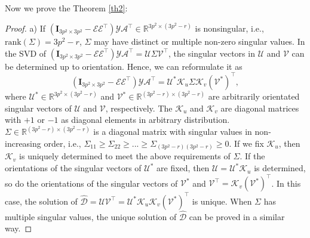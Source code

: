 Now we prove the Theorem \ref{th2}:
\begin{proof} 
a) If $(\bm{I}_{3p^2\times 3p^2}-\mathcal{E}\mathcal{E}^{\top})\mathcal{Y}\mathcal{A}^{\top}\in\mathbb{R}^{3p^2\times (3p^2-r)}$ is nonsingular, i.e., $\text{rank}(\Sigma)=3p^2-r$, $\Sigma$ may have distinct or multiple non-zero singular values. In the SVD \cite{eckart1936approximation} of $(\bm{I}_{3p^2\times 3p^2}-\mathcal{E}\mathcal{E}^{\top})\mathcal{Y}\mathcal{A}^{\top}
=
\mathcal{U}\Sigma\mathcal{V}^{\top}$, the singular vectors in $\mathcal{U}$ and $\mathcal{V}$
can be determined up to orientation. Hence, we can reformulate it as 
\begin{equation}\label{equ27}
(\bm{I}_{3p^2\times 3p^2}-\mathcal{E}\mathcal{E}^{\top})\mathcal{Y}\mathcal{A}^{\top}
=
\mathcal{U}^{*}\mathcal{K}_{u}\Sigma\mathcal{K}_{v}(\mathcal{V}^{*})^{\top},
\end{equation}
where $\mathcal{U}^{*}\in \mathbb{R}^{3p^2\times (3p^2-r)}$ and $\mathcal{V}^{*}\in \mathbb{R}^{(3p^2-r)\times (3p^2-r)}$ are arbitrarily orientated singular vectors of $\mathcal{U}$ and $\mathcal{V}$, respectively. The $\mathcal{K}_{u}$ and $\mathcal{K}_{v}$ are diagonal matrices with $+1$ or $-1$ as diagonal elements in arbitrary distribution. $\Sigma\in \mathbb{R}^{(3p^2-r)\times (3p^2-r)}$ is a diagonal matrix with singular values in non-increasing order, i.e., $\Sigma_{11}\ge\Sigma_{22}\ge...\ge\Sigma_{(3p^2-r)(3p^2-r)}\ge0$. If we fix $\mathcal{K}_{u}$, then $\mathcal{K}_{v}$ is uniquely determined to meet the above requirements of $\Sigma$. If the orientations of the singular vectors of $\mathcal{U}^{*}$ are fixed, then $\mathcal{U}=\mathcal{U}^{*}\mathcal{K}_{u}$ is determined, so do the orientations of the singular vectors of $\mathcal{V}^{*}$ and $\mathcal{V}^{\top}=\mathcal{K}_{v}(\mathcal{V}^{*})^{\top}$. In this case, the solution of $\hat{\mathcal{D}}=\mathcal{U}\mathcal{V}^{\top}=\mathcal{U}^{*}\mathcal{K}_{u}\mathcal{K}_{v}(\mathcal{V}^{*})^{\top}$ is unique. When $\Sigma$ has multiple singular values, the unique solution of $\hat{\mathcal{D}}$ can be proved in a similar way. 


\end{proof}
